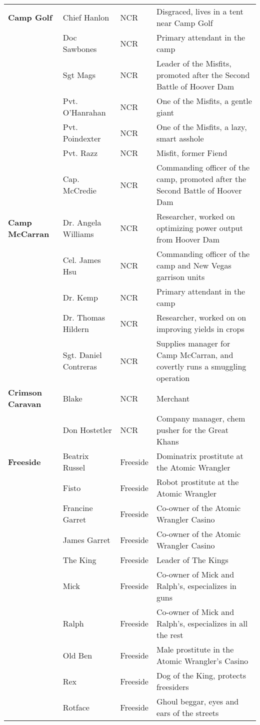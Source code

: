 \begin{longtable}{|p{3cm}|p{3cm}|p{4cm}|p{8cm}|}
\bfseries Camp Golf & Chief Hanlon & NCR & Disgraced, lives in a tent near Camp Golf \\
\hfill & Doc Sawbones & NCR & Primary attendant in the camp \\
\hfill & Sgt Mags & NCR & Leader of the Misfits, promoted after the Second Battle of Hoover Dam \\
\hfill & Pvt. O'Hanrahan & NCR & One of the Misfits, a gentle giant \\
\hfill & Pvt. Poindexter & NCR & One of the Misfits, a lazy, smart asshole \\
\hfill & Pvt. Razz & NCR & Misfit, former Fiend \\
\hfill & Cap. McCredie & NCR & Commanding officer of the camp, promoted after the Second Battle of Hoover Dam \\

\bfseries Camp McCarran & Dr. Angela Williams & NCR & Researcher, worked on optimizing power output from Hoover Dam  \\
\hfill & Cel. James Hsu & NCR & Commanding officer of the camp and New Vegas garrison units \\
\hfill & Dr. Kemp & NCR & Primary attendant in the camp \\
\hfill & Dr. Thomas Hildern & NCR & Researcher, worked on on improving yields in crops \\
\hfill & Sgt. Daniel Contreras & NCR & Supplies manager for Camp McCarran, and covertly runs a smuggling operation \\

\bfseries Crimson Caravan & Blake & NCR & Merchant \\
\hfill & Don Hostetler & NCR & Company manager, chem pusher for the Great Khans \\

\bfseries Freeside & Beatrix Russel & Freeside & Dominatrix prostitute at the Atomic Wrangler \\
\hfill & Fisto & Freeside & Robot prostitute at the Atomic Wrangler \\
\hfill & Francine Garret & Freeside & Co-owner of the Atomic Wrangler Casino \\
\hfill & James Garret & Freeside & Co-owner of the Atomic Wrangler Casino \\
\hfill & The King & Freeside & Leader of The Kings \\
\hfill & Mick & Freeside & Co-owner of Mick and Ralph's, especializes in guns \\
\hfill & Ralph & Freeside & Co-owner of Mick and Ralph's, especializes in all the rest \\
\hfill & Old Ben & Freeside & Male prostitute in the Atomic Wrangler's Casino \\
\hfill & Rex & Freeside & Dog of the King, protects freesiders \\
\hfill & Rotface & Freeside & Ghoul beggar, eyes and ears of the streets \\


\end{longtable}
